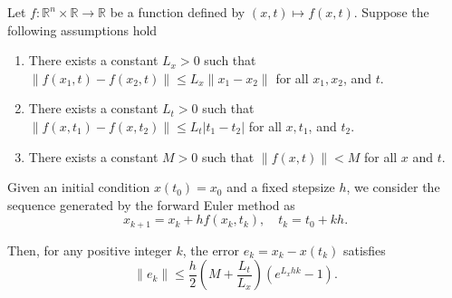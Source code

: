 \documentclass[10pt,a4paper]{amsart}
\begin{document}
\begin{proposition}
\label{prop:forward_Euler_error}
Let $f:\mathbb{R}^n\times\mathbb{R}\rightarrow \mathbb{R}$ be a function defined by $(x,t)\mapsto f(x,t)$. Suppose the following assumptions hold
\begin{enumerate}
    \item There exists a constant $ L_x > 0 $ such that $ \| f(x_1, t) - f(x_2, t) \| \leq L_x \| x_1 - x_2 \| $ for all $ x_1, x_2 $, and $ t $.
    \item There exists a constant $ L_t > 0 $ such that $ \| f(x, t_1) - f(x, t_2) \| \leq L_t | t_1 - t_2 | $ for all $ x, t_1 $, and $ t_2 $.
    \item There exists a constant $ M > 0 $ such that $ \| f(x, t) \| < M $ for all $ x $ and $ t $.
\end{enumerate}

Given an initial condition $ x(t_0) = x_0 $ and a fixed stepsize $ h $, we consider the sequence generated by the forward Euler method as
\[
x_{k+1} = x_k + h f(x_k, t_k), \quad t_k = t_0 + k h.
\]

Then, for any positive integer $k$, the error $e_k = x_k - x(t_k)$ satisfies
\[
\|e_k\| \leq \frac{h}{2} \left( M + \frac{L_t}{L_x} \right) \left( e^{L_x h k} - 1 \right).
\]
\end{proposition}
\end{document}
